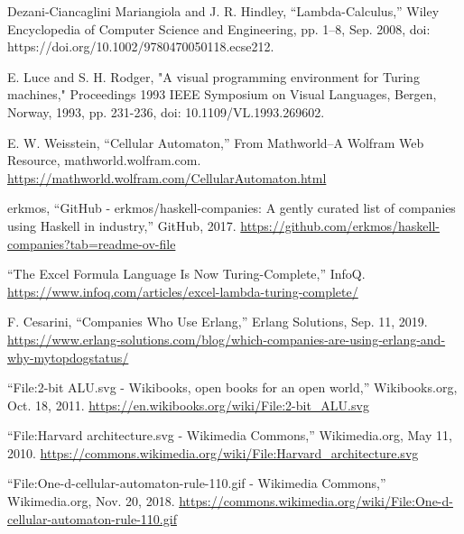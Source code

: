 \documentclass[12pt]{report} %
\begin{document}
\begin{singlespace}
\begin{thebibliography}{}
             Dezani‐Ciancaglini Mariangiola and J. R. Hindley, “Lambda-Calculus,” Wiley Encyclopedia of Computer Science and Engineering, pp. 1–8, Sep. 2008, doi: https://doi.org/10.1002/9780470050118.ecse212.
            
             E. Luce and S. H. Rodger, "A visual programming environment for Turing machines," Proceedings 1993 IEEE Symposium on Visual Languages, Bergen, Norway, 1993, pp. 231-236, doi: 10.1109/VL.1993.269602.
            
             E. W. Weisstein, “Cellular Automaton,” From Mathworld--A Wolfram Web Resource, mathworld.wolfram.com. \href{https://mathworld.wolfram.com/CellularAutomaton.html}{https://mathworld.wolfram.com/CellularAutomaton.html}
            
             erkmos, “GitHub - erkmos/haskell-companies: A gently curated list of companies using Haskell in industry,” GitHub, 2017. \href{https://github.com/erkmos/haskell-companies?tab=readme-ov-file}{https://github.com/erkmos/haskell-companies?tab=readme-ov-file}
            
             “The Excel Formula Language Is Now Turing-Complete,” InfoQ. \href{https://www.infoq.com/articles/excel-lambda-turing-complete/}{https://www.infoq.com/articles/excel-lambda-turing-complete/}
            
             F. Cesarini, “Companies Who Use Erlang,” Erlang Solutions, Sep. 11, 2019. \href{https://www.erlang-solutions.com/blog/which-companies-are-using-erlang-and-why-mytopdogstatus/}{https://www.erlang-solutions.com/blog/which-companies-are-using-erlang-and-why-mytopdogstatus/}
            
             “File:2-bit ALU.svg - Wikibooks, open books for an open world,” Wikibooks.org, Oct. 18, 2011. \href{https://en.wikibooks.org/wiki/File:2-bit_ALU.svg}{https://en.wikibooks.org/wiki/File:2-bit\_ALU.svg}
            
             “File:Harvard architecture.svg - Wikimedia Commons,” Wikimedia.org, May 11, 2010. \href{https://commons.wikimedia.org/wiki/File:Harvard_architecture.svg}{https://commons.wikimedia.org/wiki/File:Harvard\_architecture.svg}
            
             “File:One-d-cellular-automaton-rule-110.gif - Wikimedia Commons,” Wikimedia.org, Nov. 20, 2018. \href{https://commons.wikimedia.org/wiki/File:One-d-cellular-automaton-rule-110.gif}{https://commons.wikimedia.org/wiki/File:One-d-cellular-automaton-rule-110.gif}
            

\end{thebibliography}
\end{singlespace}
\end{document}
